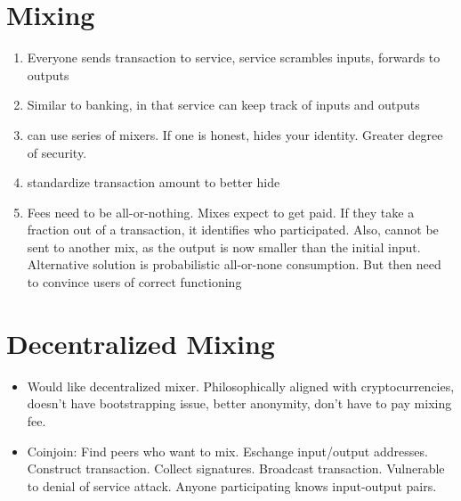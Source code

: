 \documentclass{article}
\begin{document}
\section{Mixing}
\begin{enumerate}
\item Everyone sends transaction to service, service scrambles inputs, forwards to outputs
\item Similar to banking, in that service can keep track of inputs and outputs
\item can use series of mixers. If one is honest, hides your identity. Greater degree of security.
\item standardize transaction amount to better hide
\item Fees need to be all-or-nothing. Mixes expect to get paid. If they take a fraction out of a transaction, it identifies who participated. Also, cannot be sent to another mix, as the output is now smaller than the initial input. Alternative solution is probabilistic all-or-none consumption. But then need to convince users of correct functioning
\end{enumerate}

\section{Decentralized Mixing}
\begin{itemize}
\item Would like decentralized mixer. Philosophically aligned with cryptocurrencies, doesn't have bootstrapping issue, better anonymity, don't have to pay mixing fee.
\item Coinjoin: Find peers who want to mix. Eschange input/output addresses. Construct transaction. Collect signatures. Broadcast transaction. 
\subitem Vulnerable to denial of service attack. Anyone participating knows input-output pairs.
\end{itemize}
\end{document}
